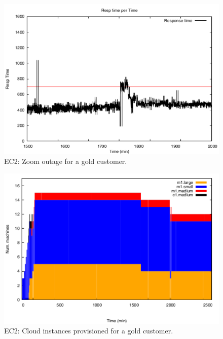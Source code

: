 \begin{figure}
  \begin{center}
    \includegraphics[width=.85\linewidth]{images/exps2011/high/ec2/proxyDataPoints_output_filtered.pdf}
  \end{center}
\vspace{-5mm}
  \caption{EC2: Zoom outage for a gold customer.}
  \label{zoomOutage}
\end{figure}

\begin{figure}
  \begin{center}
    \includegraphics[width=.85\linewidth]{images/exps2011/high/ec2/inst_type_machines.pdf}
  \end{center}
\vspace{-5mm}
  \caption{EC2: Cloud instances provisioned for a gold customer.}
  \label{highInstances}
\end{figure}

